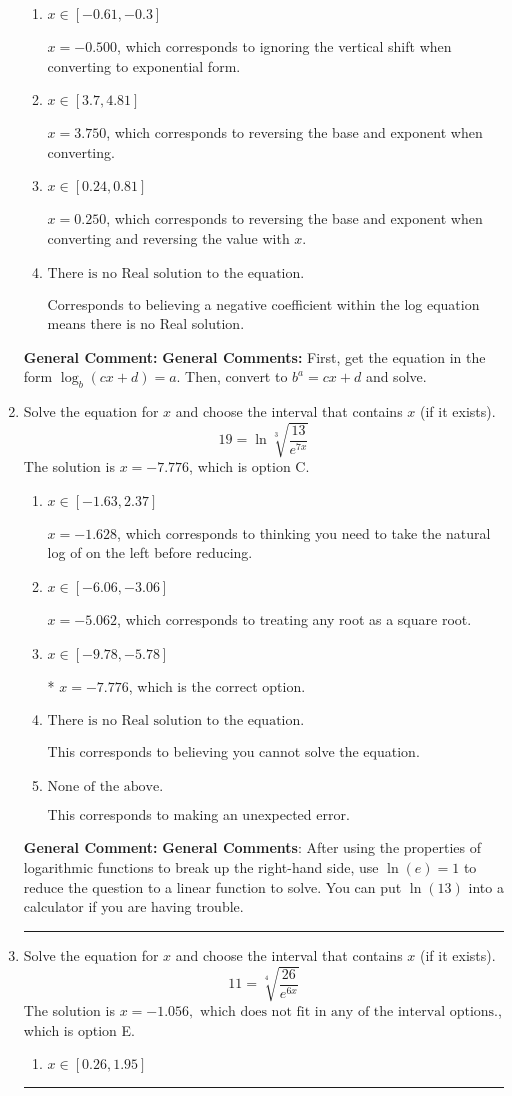 \documentclass{extbook}[14pt]
\newcommand{\litem}[1]{\item #1

\rule{\textwidth}{0.4pt}}
\begin{document}
\begin{enumerate}
{\begin{enumerate}[label=\Alph*.]
* $x = 1.722$, which is the correct option.
\item \( x \in [-0.61, -0.3] \)

$x = -0.500$, which corresponds to ignoring the vertical shift when converting to exponential form.
\item \( x \in [3.7, 4.81] \)

$x = 3.750$, which corresponds to reversing the base and exponent when converting.
\item \( x \in [0.24, 0.81] \)

$x = 0.250$, which corresponds to reversing the base and exponent when converting and reversing the value with $x$.
\item \( \text{There is no Real solution to the equation.} \)

Corresponds to believing a negative coefficient within the log equation means there is no Real solution.
\end{enumerate}

\textbf{General Comment:} \textbf{General Comments:} First, get the equation in the form $\log_b{(cx+d)} = a$. Then, convert to $b^a = cx+d$ and solve.
}
\litem{
 Solve the equation for $x$ and choose the interval that contains $x$ (if it exists).
\[  19 = \ln{\sqrt[3]{\frac{13}{e^{7x}}}} \]The solution is \( x = -7.776 \), which is option C.\begin{enumerate}[label=\Alph*.]
\item \( x \in [-1.63, 2.37] \)

$x = -1.628$, which corresponds to thinking you need to take the natural log of on the left before reducing.
\item \( x \in [-6.06, -3.06] \)

$x = -5.062$, which corresponds to treating any root as a square root.
\item \( x \in [-9.78, -5.78] \)

* $x = -7.776$, which is the correct option.
\item \( \text{There is no Real solution to the equation.} \)

This corresponds to believing you cannot solve the equation.
\item \( \text{None of the above.} \)

This corresponds to making an unexpected error.
\end{enumerate}

\textbf{General Comment:} \textbf{General Comments}: After using the properties of logarithmic functions to break up the right-hand side, use $\ln(e) = 1$ to reduce the question to a linear function to solve. You can put $\ln(13)$ into a calculator if you are having trouble.
}
\litem{
 Solve the equation for $x$ and choose the interval that contains $x$ (if it exists).
\[  11 = \sqrt[4]{\frac{26}{e^{6x}}} \]The solution is \( x = -1.056, \text{ which does not fit in any of the interval options.} \), which is option E.\begin{enumerate}[label=\Alph*.]
\item \( x \in [0.26, 1.95] \)


\end{enumerate}}
\end{enumerate}
\end{document}
